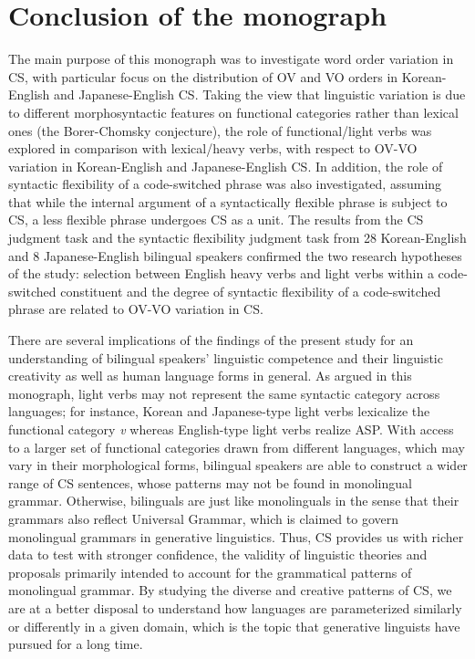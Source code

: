 \section{Conclusion of the monograph}\label{ch6:sect:conclusion}

The main purpose of this monograph was to investigate word order variation in \ac{CS}, with particular focus on the distribution of \ac{OV} and \ac{VO} orders in Korean-English and Japanese-English \ac{CS}. Taking the view that linguistic variation is due to different morphosyntactic features on functional categories rather than lexical ones (the Borer-Chomsky conjecture), the role of functional/light verbs was explored in comparison with lexical/heavy verbs, with respect to \ac{OV}-\ac{VO} variation in Korean-English and Japanese-English \ac{CS}. In addition, the role of syntactic flexibility of a code-switched phrase was also investigated, assuming that while the internal argument of a syntactically flexible phrase is subject to \ac{CS}, a less flexible phrase undergoes \ac{CS} as a unit. The results from the \ac{CS} judgment task and the syntactic flexibility judgment task from 28 Korean-English and 8 Japanese-English bilingual speakers confirmed the two research hypotheses of the study: selection between English heavy verbs and light verbs within a code-switched constituent and the degree of syntactic flexibility of a code-switched phrase are related to \ac{OV}-\ac{VO} variation in \ac{CS}.

There are several implications of the findings of the present study for an understanding of bilingual speakers’ linguistic competence and their linguistic creativity as well as human language forms in general. As argued in this monograph, light verbs may not represent the same syntactic category across languages; for instance, Korean and Japanese-type light verbs lexicalize the functional category \textit{v} whereas English-type light verbs realize \ac{ASP}. With access to a larger set of functional categories drawn from different languages, which may vary in their morphological forms, bilingual speakers are able to construct a wider range of \ac{CS} sentences, whose patterns may not be found in monolingual grammar. Otherwise, bilinguals are just like monolinguals in the sense that their grammars also reflect Universal Grammar, which is claimed to govern monolingual grammars in generative linguistics. Thus, \ac{CS} provides us with richer data to test with stronger confidence, the validity of linguistic theories and proposals primarily intended to account for the grammatical patterns of monolingual grammar. By studying the diverse and creative patterns of \ac{CS}, we are at a better disposal to understand how languages are parameterized similarly or differently in a given domain, which is the topic that generative linguists have pursued for a long time.

